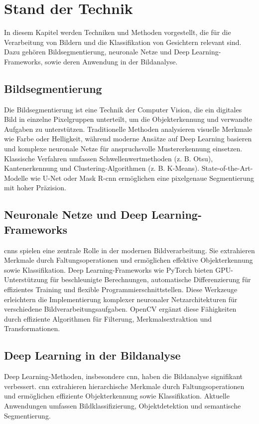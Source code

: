 \documentclass[journal,twoside,web]{ieeecolor}
\begin{document}
\section{Stand der Technik}
In diesem Kapitel werden Techniken und Methoden vorgestellt, die für die Verarbeitung von Bildern und die Klassifikation von Gesichtern relevant sind. Dazu gehören Bildsegmentierung, neuronale Netze und Deep Learning-Frameworks, sowie deren Anwendung in der Bildanalyse.

\subsection{Bildsegmentierung}  
Die Bildsegmentierung ist eine Technik der Computer Vision, die ein digitales Bild in einzelne Pixelgruppen unterteilt, um die Objekterkennung und verwandte Aufgaben zu unterstützen.  
Traditionelle Methoden analysieren visuelle Merkmale wie Farbe oder Helligkeit, während moderne Ansätze auf Deep Learning basieren und komplexe neuronale Netze für anspruchsvolle Mustererkennung einsetzen.  
Klassische Verfahren umfassen Schwellenwertmethoden (z. B. Otsu), Kantenerkennung und Clustering-Algorithmen (z. B. K-Means).  
State-of-the-Art-Modelle wie U-Net oder Mask R-\ac{cnn} ermöglichen eine pixelgenaue Segmentierung mit hoher Präzision.  

\subsection{Neuronale Netze und Deep Learning-Frameworks}  
\acp{cnn} spielen eine zentrale Rolle in der modernen Bildverarbeitung.
Sie extrahieren Merkmale durch Faltungsoperationen und ermöglichen effektive Objekterkennung sowie Klassifikation.
Deep Learning-Frameworks wie PyTorch bieten GPU-Unterstützung für beschleunigte Berechnungen, automatische Differenzierung für effizientes Training und flexible Programmierschnittstellen.
Diese Werkzeuge erleichtern die Implementierung komplexer neuronaler Netzarchitekturen für verschiedene Bildverarbeitungsaufgaben.
OpenCV ergänzt diese Fähigkeiten durch effiziente Algorithmen für Filterung, Merkmalsextraktion und Transformationen.

\subsection{Deep Learning in der Bildanalyse}  %
Deep Learning-Methoden, insbesondere \ac{cnn}, haben die Bildanalyse signifikant verbessert.
\ac{cnn} extrahieren hierarchische Merkmale durch Faltungsoperationen und ermöglichen effiziente Objekterkennung sowie Klassifikation.
Aktuelle Anwendungen umfassen Bildklassifizierung, Objektdetektion und semantische Segmentierung.
\end{document}

